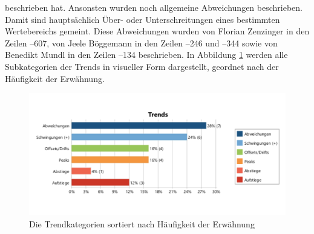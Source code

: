 beschrieben hat. Ansonsten wurden noch allgemeine Abweichungen beschrieben. Damit sind hauptsächlich Über- oder Unterschreitungen eines bestimmten Wertebereichs gemeint. Diese Abweichungen wurden von Florian Zenzinger in den Zeilen --607, von Jeele Böggemann in den Zeilen --246 und --344 sowie von Benedikt Mundl in den Zeilen --134 beschrieben. In Abbildung \ref{fig:trends} werden alle Subkategorien der Trends in visueller Form dargestellt, geordnet nach der Häufigkeit der Erwähnung. 
\begin{figure}[h!]
\centering
\includegraphics[scale=0.7]{appendix/InterviewTrends/anzahl trends.pdf}
\caption{Die Trendkategorien sortiert nach Häufigkeit der Erwähnung}
\label{fig:trends}
\end{figure}
